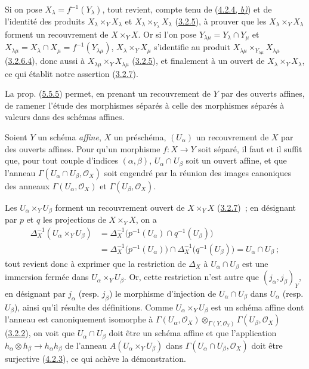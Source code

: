Si on pose $X_\lambda=f^{-1}(Y_\lambda)$, tout revient, compte tenu de
(\hyperref[I.4.2.4-fr]{4.2.4, \emph{b)}}) et de l'identité des produits
$X_\lambda\times_Y X_\lambda$ et
$X_\lambda\times_{Y_\lambda}X_\lambda$
(\hyperref[I.3.2.5-fr]{3.2.5}), à prouver que les
$X_\lambda\times_Y X_\lambda$ forment un recouvrement de $X\times_Y X$. Or
si l'on pose $Y_{\lambda\mu}=Y_\lambda\cap Y_\mu$ et
$X_{\lambda\mu}=X_\lambda\cap X_\mu=f^{-1}(Y_{\lambda\mu})$,
$X_\lambda\times_Y X_\mu$ s'identifie au produit
$X_{\lambda\mu}\times_{Y_{\lambda\mu}}X_{\lambda\mu}$
(\hyperref[I.3.2.6.4-fr]{3.2.6.4}), donc aussi à
$X_{\lambda\mu}\times_Y X_{\lambda\mu}$
(\hyperref[I.3.2.5-fr]{3.2.5}), et finalement à un ouvert de
$X_\lambda\times_Y X_\lambda$, ce qui établit notre assertion
(\hyperref[I.3.2.7-fr]{3.2.7}).

La prop. (\hyperref[I.5.5.5-fr]{5.5.5}) permet, en prenant un recouvrement de
$Y$ par des ouverts affines, de ramener l'étude des morphismes séparés à celle
des morphismes séparés à valeurs dans des schémas affines.

\begin{proposition}[5.5.6]
\label{I.5.5.6-fr}
Soient $Y$ un schéma \emph{affine}, $X$ un préschéma, $(U_\alpha)$ un recouvrement de
$X$ par des ouverts affines. Pour qu'un morphisme $f:X\to Y$ soit séparé, il
faut et il suffit que, pour tout couple d'indices $(\alpha,\beta)$,
$U_\alpha\cap U_\beta$ soit un ouvert affine, et que l'anneau
$\Gamma(U_\alpha\cap U_\beta,\mathscr{O}_X)$ soit engendré par la réunion des
images canoniques des anneaux $\Gamma(U_\alpha,\mathscr{O}_X)$ et
$\Gamma(U_\beta,\mathscr{O}_X)$.
\end{proposition}

Les $U_\alpha\times_Y U_\beta$ forment un recouvrement ouvert de
$X\times_Y X$ (\hyperref[I.3.2.7-fr]{3.2.7})~; en désignant par $p$ et $q$ les
projections de $X\times_Y X$, on a
\[
  \begin{aligned}
    \Delta_X^{-1}(U_\alpha\times_Y U_\beta)
      &=\Delta_X^{-1}\bigl(p^{-1}(U_\alpha)\cap q^{-1}(U_\beta)\bigr)\\
      &=\Delta_X^{-1}\bigl(p^{-1}(U_\alpha)\bigr)
        \cap\Delta_X^{-1}\bigl(q^{-1}(U_\beta)\bigr)
        =U_\alpha\cap U_\beta~;
  \end{aligned}
\]
tout revient donc à exprimer que la restriction de $\Delta_X$ à
$U_\alpha\cap U_\beta$ est une immersion fermée dans
$U_\alpha\times_Y U_\beta$. Or, cette restriction n'est autre que
$(j_\alpha,j_\beta)_Y$, en désignant par $j_\alpha$ (resp. $j_\beta$) le
morphisme d'injection de $U_\alpha\cap U_\beta$ dans $U_\alpha$ (resp.
$U_\beta$), ainsi qu'il résulte des définitions. Comme
$U_\alpha\times_Y U_\beta$ est un schéma affine dont l'anneau est
canoniquement isomorphe à
$\Gamma(U_\alpha,\mathscr{O}_X)
 \otimes_{\Gamma(Y,\mathscr{O}_Y)}
 \Gamma(U_\beta,\mathscr{O}_X)$
(\hyperref[I.3.2.2-fr]{3.2.2}), on voit que $U_\alpha\cap U_\beta$ doit être
un schéma affine et que l'application
$h_\alpha\otimes h_\beta\to h_\alpha h_\beta$ de l'anneau
$A(U_\alpha\times_Y U_\beta)$ dans
$\Gamma(U_\alpha\cap U_\beta,\mathscr{O}_X)$ doit être surjective
(\hyperref[I.4.2.3-fr]{4.2.3}), ce qui achève la démonstration.

